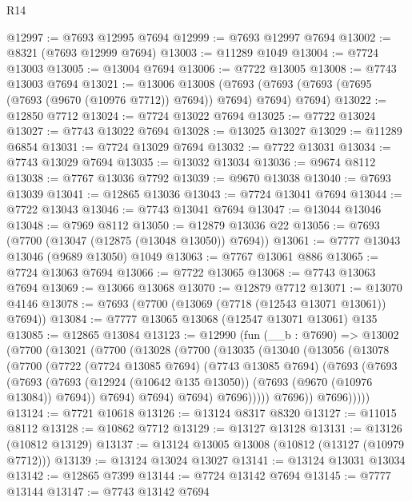 \begin{lexlean}{R14}
\begin{coremodule}
@12997 := @7693 @12995 @7694
@12999 := @7693 @12997 @7694
@13002 := @8321 (@7693 @12999 @7694)
@13003 := @11289 @1049
@13004 := @7724 @13003
@13005 := @13004 @7694
@13006 := @7722 @13005
@13008 := @7743 @13003 @7694
@13021 := @13006
    @13008
    (@7693 (@7693 (@7693 (@7695 (@7693 (@9670 (@10976 @7712)) @7694)) @7694) @7694) @7694)
@13022 := @12850 @7712
@13024 := @7724 @13022 @7694
@13025 := @7722 @13024
@13027 := @7743 @13022 @7694
@13028 := @13025 @13027
@13029 := @11289 @6854
@13031 := @7724 @13029 @7694
@13032 := @7722 @13031
@13034 := @7743 @13029 @7694
@13035 := @13032 @13034
@13036 := @9674 @8112
@13038 := @7767 @13036 @7792
@13039 := @9670 @13038
@13040 := @7693 @13039
@13041 := @12865 @13036
@13043 := @7724 @13041 @7694
@13044 := @7722 @13043
@13046 := @7743 @13041 @7694
@13047 := @13044 @13046
@13048 := @7969 @8112
@13050 := @12879 @13036 @22
@13056 := @7693 (@7700 (@13047 (@12875 (@13048 @13050)) @7694))
@13061 := @7777 @13043 @13046 (@9689 @13050) @1049
@13063 := @7767 @13061 @886
@13065 := @7724 @13063 @7694
@13066 := @7722 @13065
@13068 := @7743 @13063 @7694
@13069 := @13066 @13068
@13070 := @12879 @7712
@13071 := @13070 @4146
@13078 := @7693 (@7700 (@13069 (@7718 (@12543 @13071 @13061)) @7694))
@13084 := @7777 @13065 @13068 (@12547 @13071 @13061) @135
@13085 := @12865 @13084
@13123 := @12990
    (fun (__b : @7690) =>
    @13002
      (@7700
        (@13021
          (@7700
            (@13028
              (@7700
                (@13035
                  (@13040
                    (@13056
                      (@13078
                        (@7700
                          (@7722
                            (@7724 @13085 @7694)
                            (@7743 @13085 @7694)
                            (@7693
                              (@7693
                                (@7693
                                  (@7693
                                    (@12924 (@10642 @135 @13050))
                                    (@7693 (@9670 (@10976 @13084)) @7694))
                                  @7694)
                                @7694)
                              @7694)
                            @7696)))))
                  @7696))
              @7696)))))
@13124 := @7721 @10618
@13126 := @13124 @8317 @8320
@13127 := @11015 @8112
@13128 := @10862 @7712
@13129 := @13127 @13128
@13131 := @13126 (@10812 @13129)
@13137 := @13124 @13005 @13008 (@10812 (@13127 (@10979 @7712)))
@13139 := @13124 @13024 @13027
@13141 := @13124 @13031 @13034
@13142 := @12865 @7399
@13144 := @7724 @13142 @7694
@13145 := @7777 @13144
@13147 := @7743 @13142 @7694

\end{coremodule}
\end{lexlean}
